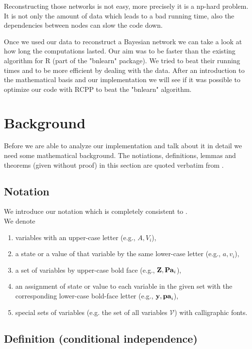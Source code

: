Reconstructing those networks is not easy, more precisely it is a np-hard problem. It is not only the amount of data which leads to a bad running time, also the dependencies between nodes can slow the code down.

Once we used our data to reconstruct a Bayesian network we can take a look at how long the computations lasted. Our aim was to be faster than the existing algorithm for R (part of the "bnlearn" package). We tried to beat their running times and to be more efficient by dealing with the data. After an introduction to the mathematical basis and our implementation we will see if it was possible to optimize our code with RCPP to beat the "bnlearn" algorithm.

\chapter{Background}

	Before we are able to analyze our implementation and talk about it in detail we need some mathematical background. The notiations, definitions, lemmas and theorems (given without proof) in this section are quoted verbatim from \cite{TBA}.

	\section*{Notation}

		We introduce our notation which is completely consistent to \cite{TBA}.\\
		We denote
		\begin{enumerate}
			\item variables with an upper-case letter (e.g., $A, V_{i}$),
			\item a state or a value of that variable by the same lower-case letter (e.g., $a, v_{i}$),
			\item a set of variables by upper-case bold face (e.g., ${\textbf{Z}}, {\textbf{Pa}}_{i}$),
			\item an assignment of state or value to each variable in the given set with the corresponding lower-case bold-face letter (e.g., ${\textbf{y}}, {\textbf{pa}}_{i}$),
			\item special sets of variables (e.g. the set of all variables $\mathcal{V}$) with calligraphic fonts.
		\end{enumerate}

	\section*{Definition (conditional independence)} \label{s.Def1}
	
